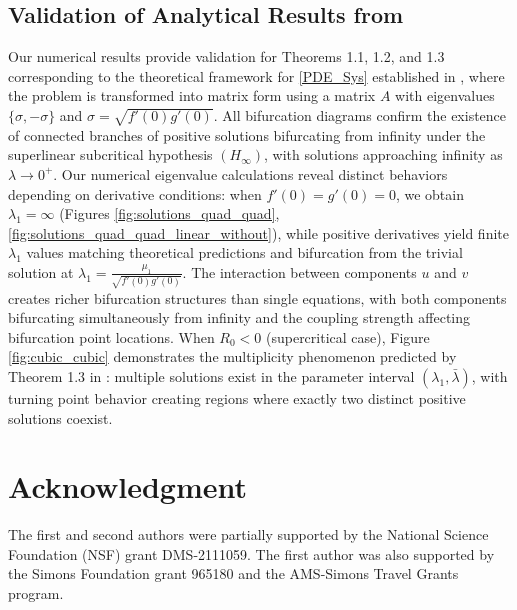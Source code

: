 \documentclass[12pt, reqno]{amsart}
\numberwithin{equation}{section}
\begin{document}

\subsection{Validation of Analytical Results from \cite{BCDMP_Systems}}
\label{subsec:connection-systems}
Our numerical results provide validation for Theorems 1.1, 1.2, and 1.3 corresponding to the theoretical framework for \eqref{PDE_Sys} established in \cite{BCDMP_Systems}, where the problem is transformed into matrix form using a matrix $A$ with eigenvalues $\{\sigma, -\sigma\}$ and $\sigma = \sqrt{f'(0)g'(0)}$. All bifurcation diagrams confirm the existence of connected branches of positive solutions bifurcating from infinity under the superlinear subcritical hypothesis $(H_\infty)$, with solutions approaching infinity as $\lambda \to 0^+$. Our numerical eigenvalue calculations reveal distinct behaviors depending on derivative conditions: when $f'(0) = g'(0) = 0$, we obtain $\lambda_1 = \infty$ (Figures \ref{fig:solutions_quad_quad}, \ref{fig:solutions_quad_quad_linear_without}), while positive derivatives yield finite $\lambda_1$ values matching theoretical predictions and bifurcation from the trivial solution at $\lambda_1 = \frac{\mu_1}{\sqrt{f'(0)g'(0)}}$. The interaction between components $u$ and $v$ creates richer bifurcation structures than single equations, with both components bifurcating simultaneously from infinity and the coupling strength affecting bifurcation point locations. When $R_0 < 0$ (supercritical case), Figure \ref{fig:cubic_cubic} demonstrates the multiplicity phenomenon predicted by Theorem 1.3 in \cite{BCDMP_Systems}: multiple solutions exist in the parameter interval $(\lambda_1, \bar{\lambda})$, with turning point behavior creating regions where exactly two distinct positive solutions coexist.


\section{Acknowledgment} 
The first and second authors were partially supported by the National Science Foundation (NSF) grant DMS-2111059. 
The first author was also supported by the Simons Foundation grant 965180 and the AMS-Simons Travel Grants program.
 
\end{document}
